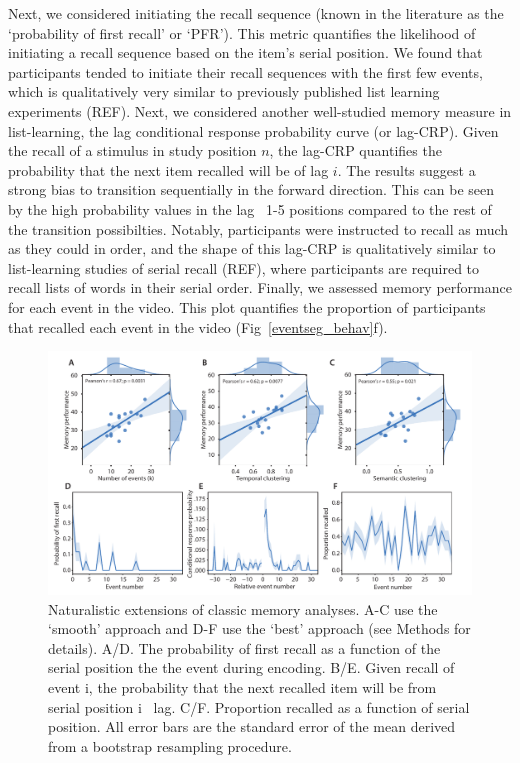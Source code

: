 \documentclass{article}
\begin{document}
{Next, we considered initiating the recall sequence (known in the literature as the `probability of first recall' or `PFR'). This metric quantifies the likelihood of initiating a recall sequence based on the item's serial position. We found that participants tended to initiate their recall sequences with the first few events, which is qualitatively very similar to previously published list learning experiments (REF).  Next, we considered another well-studied memory measure in list-learning, the lag conditional response probability curve (or lag-CRP). Given the recall of a stimulus in study position $n$, the lag-CRP quantifies the probability that the next item recalled will be of lag $i$. The results suggest a strong bias to transition sequentially in the forward direction. This can be seen by the high probability values in the lag ~1-5 positions compared to the rest of the transition possibilties. Notably, participants were instructed to recall as much as they could in order, and the shape of this lag-CRP is qualitatively similar to list-learning studies of serial recall (REF), where participants are required to recall lists of words in their serial order. Finally, we assessed memory performance for each event in the video. This plot quantifies the proportion of participants that recalled each event in the video (Fig~\ref{eventseg_behav}f).

\begin{figure}[ht!]
\centering
\includegraphics[width=1\textwidth]{figs/4_behav_eventseg.pdf}
\caption{\label{fig:behav}Naturalistic extensions of classic memory analyses. A-C use the `smooth' approach and D-F use the `best' approach (see Methods for details). A/D. The probability of first recall as a function of the serial position the the event during encoding. B/E. Given recall of event i, the probability that the next recalled item will be from serial position i \rpm~lag. C/F. Proportion recalled as a function of serial position. All error bars are the standard error of the mean derived from a bootstrap resampling procedure.
}
\end{figure}

}
\end{document}
